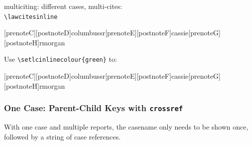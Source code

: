 \spotsep


\noindent
\theball
multiciting: different cases, multi-cites: \\
\verb|\lawcitesinline|
\bigskip

\begin{filecontents}{\democodefile}
[prenoteC][postnoteD]{columbussr}[prenoteE][postnoteF]{cassie}[prenoteG][postnoteH]{rmorgan}
\end{filecontents}
\PrintCodeAndResultsStackedR

Use \verb|\setlcinlinecolour{green}| to:

\begin{filecontents}{\democodefile}
[prenoteC][postnoteD]{columbussr}[prenoteE][postnoteF]{cassie}[prenoteG][postnoteH]{rmorgan}
\end{filecontents}
\PrintCodeAndResultsStackedR
{}

\spotsep

\subsubsection{One Case: Parent-Child Keys with \texttt{crossref}}
With one case and multiple reports, the casename only needs to be shown once, followed by a string of case references.

